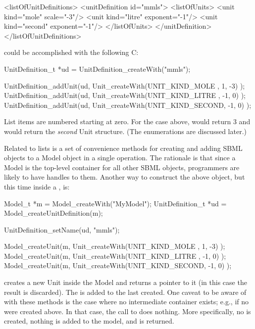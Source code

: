\documentclass{sbmlmanual}
\begin{document}
\begin{example}
  <listOfUnitDefinitions>
    <unitDefinition id="mmls">
      <listOfUnits>
        <unit kind="mole"   scale="-3"/>
        <unit kind="litre"  exponent="-1"/>
        <unit kind="second" exponent="-1"/>
      </listOfUnits>
    </unitDefinition>
  </listOfUnitDefinitions>
\end{example}


could be accomplished with the following C:

\begin{example}[c]
  UnitDefinition_t *ud = UnitDefinition_createWith("mmls");

  UnitDefinition_addUnit(ud, Unit_createWith(UNIT_KIND_MOLE  ,  1, -3) );
  UnitDefinition_addUnit(ud, Unit_createWith(UNIT_KIND_LITRE , -1,  0) );
  UnitDefinition_addUnit(ud, Unit_createWith(UNIT_KIND_SECOND, -1,  0) );
\end{example}

List items are numbered starting at zero.  For the case above, 
 would return 3 and
 would return the
\emph{second} Unit structure.  (The  enumerations
are discussed later.)

Related to lists is a set of convenience methods for creating and adding
SBML objects to a Model object in a single operation.  The rationale is
that since a Model is the top-level container for all other SBML objects,
programmers are likely to have handles to them.  Another way to construct
the above  object, but this time inside a
, is:


\begin{example}[c]
  Model_t            *m  = Model_createWith("MyModel");
  UnitDefinition_t   *ud = Model_createUnitDefinition(m);

  UnitDefinition_setName(ud, "mmls");

  Model_createUnit(m, Unit_createWith(UNIT_KIND_MOLE  ,  1, -3) );
  Model_createUnit(m, Unit_createWith(UNIT_KIND_LITRE , -1,  0) );
  Model_createUnit(m, Unit_createWith(UNIT_KIND_SECOND, -1,  0) );
\end{example}


 creates a new Unit inside the Model
 and returns a pointer to it (in this case the result is
discarded).  The  is added to the last
 created.  One caveat to be aware of with these
methods is the case where no intermediate container exists; e.g., if no
 were created above.  In that case, the call to
 does nothing.  More specifically, no
 is created, nothing is added to the model, and 
is returned.
\end{document}
